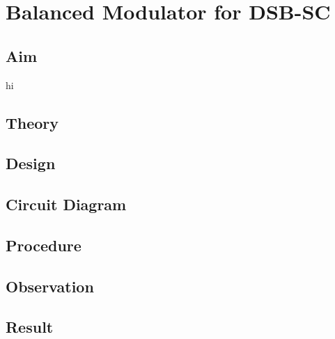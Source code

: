 \chapter[Balanced Modulator for DSB-SC]{Balanced Modulator for DSB-SC}
\section*{Aim}
hi
\section*{Theory}
\section*{Design}
\section*{Circuit Diagram}
\section*{Procedure}
\section*{Observation}
\section*{Result}
